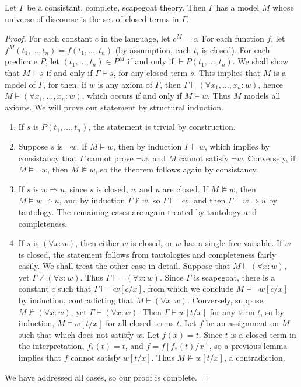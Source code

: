 \begin{lemma}
    Let $\Gamma$ be a consistant, complete, scapegoat theory. Then $\Gamma$ has a model $M$ whose universe of discourse is the set of closed terms in $\Gamma$.
\end{lemma}
\begin{proof}
    For each constant $c$ in the language, let $c^M = c$. For each function $f$, let $f^M(t_1, \dots, t_n) = f(t_1, \dots, t_n)$ (by assumption, each $t_i$ is closed). For each predicate $P$, let $(t_1, \dots, t_n) \in P^M$ if and only if $\vdash P(t_1, \dots, t_n)$. We shall show that $M \vDash s$ if and only if $\Gamma \vdash s$, for any closed term $s$. This implies that $M$ is a model of $\Gamma$, for then, if $w$ is any axiom of $\Gamma$, then $\Gamma \vdash (\forall x_1, \dots, x_n: w)$, hence $M \vDash (\forall x_1, \dots, x_n: w)$, which occurs if and only if $M \vDash w$. Thus $M$ models all axioms. We will prove our statement by structural induction.
    \begin{enumerate}
        \item If $s$ is $P(t_1, \dots, t_n)$, the statement is trivial by construction.

        \item Suppose $s$ is $\neg w$. If $M \vDash w$, then by induction $\Gamma \vdash w$, which implies by consistancy that $\Gamma$ cannot prove $\neg w$, and $M$ cannot satisfy $\neg w$. Conversely, if $M \vDash \neg w$, then $M \not \vDash w$, so the theorem follows again by consistancy.

        \item If $s$ is $w \Rightarrow u$, since $s$ is closed, $w$ and $u$ are closed. If $M \not \vDash w$, then $M \vDash w \Rightarrow u$, and by induction $\Gamma \not \vdash w$, so $\Gamma \vdash \neg w$, and then $\Gamma \vdash w \Rightarrow u$ by tautology. The remaining cases are again treated by tautology and completeness.

        \item If $s$ is $(\forall x: w)$, then either $w$ is closed, or $w$ has a single free variable. If $w$ is closed, the statement follows from tautologies and completeness fairly easily. We shall treat the other case in detail. Suppose that $M \vDash (\forall x: w)$, yet $\Gamma \not \vdash (\forall x: w)$. Thus $\Gamma \vdash \neg (\forall x: w)$. Since $\Gamma$ is scapegoat, there is a constant $c$ such that $\Gamma \vdash \neg w[c/x]$, from which we conclude $M \vDash \neg w[c/x]$ by induction, contradicting that $M \vdash (\forall x: w)$. Conversely, suppose $M \not \vDash (\forall x: w)$, yet $\Gamma \vdash (\forall x: w)$. Then $\Gamma \vdash w[t/x]$ for any term $t$, so by induction, $M \vDash w[t/x]$ for all closed terms $t$. Let $f$ be an assignment on $M$ such that which does not satisfy $w$. Let $f(x) = t$. Since $t$ is a closed term in the interpretation, $f_*(t) = t$, and $f = f[f_*(t)/x]$, so a previous lemma implies that $f$ cannot satisfy $w[t/x]$. Thus $M \not \vDash w[t/x]$, a contradiction.
    \end{enumerate}
    We have addressed all cases, so our proof is complete.
\end{proof}

